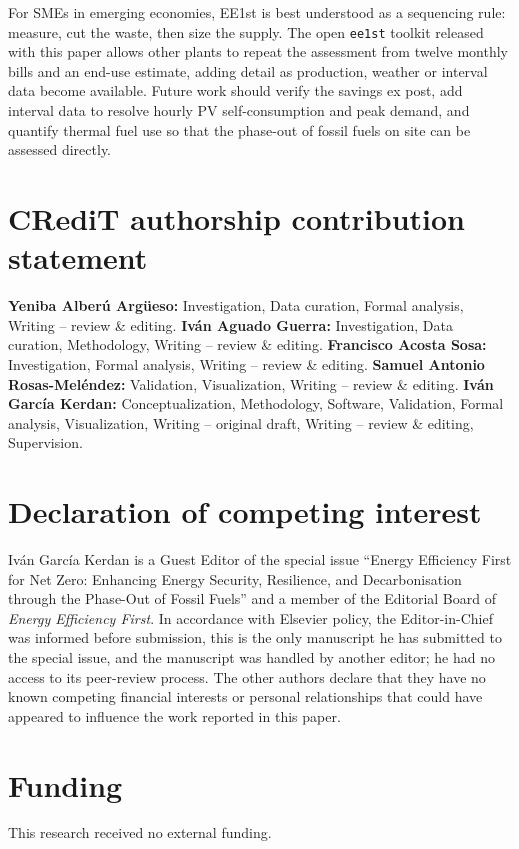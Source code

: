 \documentclass[preprint,12pt,authoryear]{elsarticle}
\begin{document}
For SMEs in emerging economies, EE1st is best understood as a sequencing rule: measure, cut the waste, then size the supply. The open \texttt{ee1st} toolkit released with this paper allows other plants to repeat the assessment from twelve monthly bills and an end-use estimate, adding detail as production, weather or interval data become available. Future work should verify the savings ex post, add interval data to resolve hourly PV self-consumption and peak demand, and quantify thermal fuel use so that the phase-out of fossil fuels on site can be assessed directly.

\FloatBarrier
\section*{CRediT authorship contribution statement}
\textbf{Yeniba Alberú Argüeso:} Investigation, Data curation, Formal analysis, Writing -- review \& editing. \textbf{Iván Aguado Guerra:} Investigation, Data curation, Methodology, Writing -- review \& editing. \textbf{Francisco Acosta Sosa:} Investigation, Formal analysis, Writing -- review \& editing. \textbf{Samuel Antonio Rosas-Meléndez:} Validation, Visualization, Writing -- review \& editing. \textbf{Iván García Kerdan:} Conceptualization, Methodology, Software, Validation, Formal analysis, Visualization, Writing -- original draft, Writing -- review \& editing, Supervision.

\section*{Declaration of competing interest}
Iván García Kerdan is a Guest Editor of the special issue ``Energy Efficiency First for Net Zero: Enhancing Energy Security, Resilience, and Decarbonisation through the Phase-Out of Fossil Fuels'' and a member of the Editorial Board of \emph{Energy Efficiency First}. In accordance with Elsevier policy, the Editor-in-Chief was informed before submission, this is the only manuscript he has submitted to the special issue, and the manuscript was handled by another editor; he had no access to its peer-review process. The other authors declare that they have no known competing financial interests or personal relationships that could have appeared to influence the work reported in this paper.

\section*{Funding}
This research received no external funding.
\end{document}

